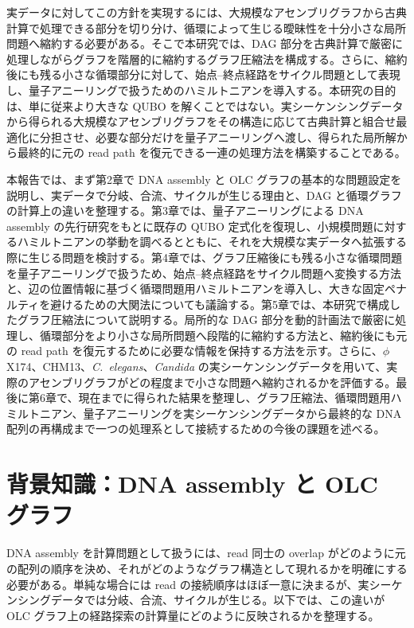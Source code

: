 \documentclass[a4j,10pt]{ujarticle}
\begin{document}
実データに対してこの方針を実現するには、大規模なアセンブリグラフから古典計算で処理できる部分を切り分け、循環によって生じる曖昧性を十分小さな局所問題へ縮約する必要がある。そこで本研究では、DAG 部分を古典計算で厳密に処理しながらグラフを階層的に縮約するグラフ圧縮法を構成する。さらに、縮約後にも残る小さな循環部分に対して、始点--終点経路をサイクル問題として表現し、量子アニーリングで扱うためのハミルトニアンを導入する。本研究の目的は、単に従来より大きな QUBO を解くことではない。実シーケンシングデータから得られる大規模なアセンブリグラフをその構造に応じて古典計算と組合せ最適化に分担させ、必要な部分だけを量子アニーリングへ渡し、得られた局所解から最終的に元の read path を復元できる一連の処理方法を構築することである。

本報告では、まず第2章で DNA assembly と OLC グラフの基本的な問題設定を説明し、実データで分岐、合流、サイクルが生じる理由と、DAG と循環グラフの計算上の違いを整理する。第3章では、量子アニーリングによる DNA assembly の先行研究をもとに既存の QUBO 定式化を復現し、小規模問題に対するハミルトニアンの挙動を調べるとともに、それを大規模な実データへ拡張する際に生じる問題を検討する。第4章では、グラフ圧縮後にも残る小さな循環問題を量子アニーリングで扱うため、始点--終点経路をサイクル問題へ変換する方法と、辺の位置情報に基づく循環問題用ハミルトニアンを導入し、大きな固定ペナルティを避けるための大関法についても議論する。第5章では、本研究で構成したグラフ圧縮法について説明する。局所的な DAG 部分を動的計画法で厳密に処理し、循環部分をより小さな局所問題へ段階的に縮約する方法と、縮約後にも元の read path を復元するために必要な情報を保持する方法を示す。さらに、$\phi$X174、CHM13、\textit{C.~elegans}、\textit{Candida} の実シーケンシングデータを用いて、実際のアセンブリグラフがどの程度まで小さな問題へ縮約されるかを評価する。最後に第6章で、現在までに得られた結果を整理し、グラフ圧縮法、循環問題用ハミルトニアン、量子アニーリングを実シーケンシングデータから最終的な DNA 配列の再構成まで一つの処理系として接続するための今後の課題を述べる。








\section{背景知識：DNA assembly と OLC グラフ}

DNA assembly を計算問題として扱うには、read 同士の overlap がどのように元の配列の順序を決め、それがどのようなグラフ構造として現れるかを明確にする必要がある。単純な場合には read の接続順序はほぼ一意に決まるが、実シーケンシングデータでは分岐、合流、サイクルが生じる。以下では、この違いが OLC グラフ上の経路探索の計算量にどのように反映されるかを整理する。
\end{document}
